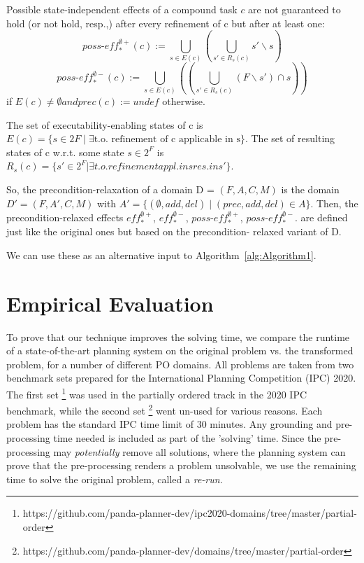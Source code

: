 \documentclass[letterpaper]{article}
\newcommand{\RelEffPlus} {\ensuremath{\mathit{eff^{\emptyset +}_{*}}}}
\newcommand{\RelEffMinus} {\ensuremath{\mathit{eff^{\emptyset -}_{*}}}}
\newcommand{\RelPossEffPlus} {\ensuremath{\mathit{\textit{poss-eff}^{\emptyset +}_{*}}}}
\newcommand{\RelPossEffMinus} {\ensuremath{\mathit{\textit{poss-eff}^{\emptyset -}_{*}}}}
\begin{document}
Possible state-independent effects of a compound task $c$ are not guaranteed to hold (or not hold, resp.,)
after every refinement of c but after at least one:
$$ \RelPossEffPlus(c) := \bigcup_{s \in E(c)}  ( \bigcup_{s' \in R_s(c)}  s' \backslash s) $$
$$ \RelPossEffMinus(c) := \bigcup_{s \in E(c)} ((\bigcup_{s' \in R_s(c)} (F \backslash s') \cap s ))$$
if $E(c) \neq \emptyset and prec(c) := undef$ otherwise.


The set of executability-enabling states of c is
$E(c) = \{s \in 2F  \mid  \exists \text{t.o. refinement of c applicable in s} \}$.
The set of resulting states of c w.r.t. some state $s \in 2^F$ is
$R_s(c) = \{s' \in 2^F | \exists t.o. refinement appl. in s res. in s' \}$.

So, the precondition-relaxation of a domain D = $(F, A, C, M)$ is the domain $D' = (F, A', C, M)$
with $A' = \{(\emptyset, add , del ) \mid (prec, add , del ) \in A\}$.
Then, the precondition-relaxed effects $\RelEffPlus$, $\RelEffMinus$, $\RelPossEffPlus$, $\RelPossEffMinus$. are defined
just like the original ones but based on the precondition-
relaxed variant of D.
 
We can use these as an alternative input to Algorithm~\ref{alg:Algorithm1}.




\section{Empirical Evaluation}

To prove that our technique improves the solving time, we compare the runtime of a state-of-the-art planning system on the original problem vs. the transformed problem, for a number of different PO domains. All problems are taken from two benchmark sets prepared for the International Planning Competition (IPC) 2020. The first set \footnote{https://github.com/panda-planner-dev/ipc2020-domains/tree/master/partial-order} was used in the partially ordered track in the 2020 IPC benchmark, while the second set \footnote{https://github.com/panda-planner-dev/domains/tree/master/partial-order} went un-used for various reasons. Each problem has the standard IPC time limit of 30 minutes. Any grounding and pre-processing time needed is included as part of the 'solving' time. Since the pre-processing may \emph{potentially} remove all solutions, where the planning system can prove that the pre-processing renders a problem unsolvable, we use the remaining time to solve the original problem, called a \textit{re-run}.
\end{document}
